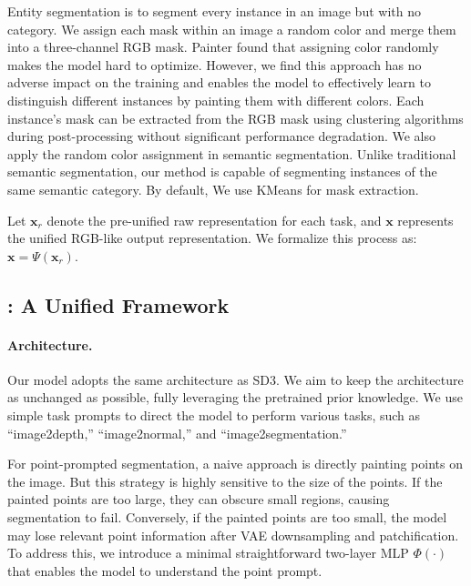 Entity segmentation is to segment every instance in an image but with no category. We assign each mask within an image a random color and merge them into a three-channel RGB mask. 
Painter found that assigning color randomly makes the model hard to optimize. However, we find this approach has no adverse impact on the training and enables the model to effectively learn to distinguish different instances by painting them with different colors. Each instance’s mask can be extracted from the RGB mask using clustering algorithms during post-processing without significant performance degradation.
We also apply the random color assignment in semantic segmentation. Unlike traditional semantic segmentation, our method is capable of segmenting instances of the same semantic category.
By default, We use KMeans for mask extraction.

Let $\mathbf x_r$ denote the pre-unified raw representation for each task, and 
$\mathbf x$ represents the unified RGB-like output representation. We formalize this process as: $\mathbf x = \Psi(\mathbf x_r)$.





\subsection{\oursbf: A Unified Framework}
\paragraph{Architecture.}
Our model adopts the same architecture as SD3. We aim to keep the architecture as unchanged as possible, fully leveraging the pretrained prior knowledge. 
We use simple task prompts to direct the model to perform various tasks, such as “image2depth,” “image2normal,” and “image2segmentation.”

For point-prompted segmentation, a naive approach is directly painting points on the image. But this strategy is highly sensitive to the size of the points. If the painted points are too large, they can obscure small regions, causing segmentation to fail. Conversely, if the painted points are too small, the model may lose relevant point information after VAE downsampling and patchification. To address this, we introduce a minimal straightforward two-layer MLP 
$\Phi(\cdot)$
that enables the model to understand the point prompt.

